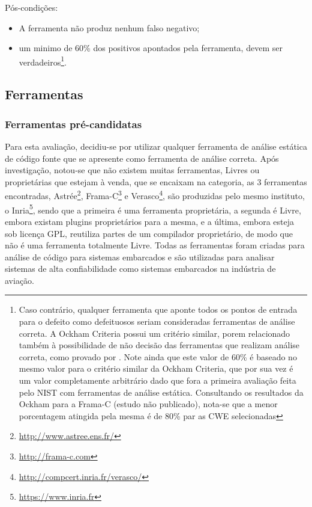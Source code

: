 Pós-condições:
\begin{itemize}
  \item A ferramenta não produz nenhum falso negativo;
  \item um minimo de 60\% dos positivos apontados pela ferramenta, devem ser verdadeiros\footnote{Caso contrário, qualquer ferramenta que aponte todos os pontos de entrada para o defeito como defeituosos seriam consideradas ferramentas de análise correta. A Ockham Criteria possui um critério similar, porem relacionado também à possibilidade de não decisão das ferramentas que realizam análise correta, como provado por \cite{rice}. Note ainda que este valor de 60\% é baseado no mesmo valor para o critério similar da Ockham Criteria, que por sua vez é um valor completamente arbitrário dado que fora a primeira avaliação feita pelo NIST com ferramentas de análise estática. Consultando os resultados da Ockham para a Frama-C (estudo não publicado), nota-se que a menor porcentagem atingida pela mesma é de 80\% par as CWE selecionadas}.
\end{itemize}

\subsection{Ferramentas}

\subsubsection{Ferramentas pré-candidatas}

Para esta avaliação, decidiu-se por utilizar qualquer ferramenta de análise estática de código fonte que se apresente como ferramenta de análise correta. Após investigação, notou-se que não existem muitas ferramentas, Livres ou proprietárias que estejam à venda, que se encaixam na categoria, as 3 ferramentas encontradas, Astrée\footnote{\url{http://www.astree.ens.fr/}}, Frama-C\footnote{\url{http://frama-c.com}} e Verasco\footnote{\url{http://compcert.inria.fr/verasco/}}, são produzidas pelo mesmo instituto, o Inria\footnote{\url{https://www.inria.fr}}, sendo que a primeira é uma ferramenta proprietária, a segunda é Livre, embora existam plugins proprietários para a mesma, e a última, embora esteja sob licença GPL, reutiliza partes de um compilador proprietário, de modo que não é uma ferramenta totalmente Livre. Todas as ferramentas foram criadas para análise de código para sistemas embarcados e são utilizadas para analisar sistemas de alta confiabilidade como sistemas embarcados na indústria de aviação.

